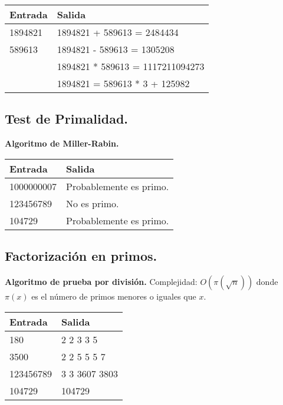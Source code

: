 \documentclass[10pt, letterpaper, twoside]{article}
\begin{document}


\begin{tabular}{|p{7cm}|p{7cm}|}
\hline
\textbf{Entrada} & \textbf{Salida}\\ \hline
1894821 & 1894821 + 589613 = 2484434\\
589613  & 1894821 - 589613 = 1305208\\ 
        & 1894821 * 589613 = 1117211094273\\ 
        & 1894821 = 589613 * 3 + 125982\\ \hline
\end{tabular}\bigskip

\subsection{Test de Primalidad.}

\textbf{Algoritmo de Miller-Rabin.}

 

\begin{tabular}{|p{7cm}|p{7cm}|}
\hline
\textbf{Entrada} & \textbf{Salida}\\ \hline
1000000007 & Probablemente es primo.\\
123456789  & No es primo.\\
104729     & Probablemente es primo.\\ \hline
\end{tabular}\bigskip

\subsection{Factorización en primos.}

\textbf{Algoritmo de prueba por división.} Complejidad: $O\left(\pi\left(\sqrt{n}\right)\right)$ donde $\pi(x)$ es el número de primos menores o iguales que $x$.



\begin{tabular}{|p{7cm}|p{7cm}|}
\hline
\textbf{Entrada} & \textbf{Salida}\\ \hline
180       & 2 2 3 3 5\\
3500      & 2 2 5 5 5 7\\ 
123456789 & 3 3 3607 3803\\
104729    & 104729\\ \hline
\end{tabular}\bigskip
\end{document}
